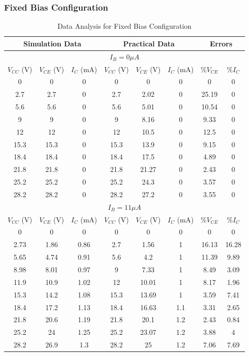\documentclass[12pt]{article}
\begin{document}
\subsubsection{Fixed Bias Configuration}
\bgroup
\def\arraystretch{1.5}
\begin{table}[h!]
    \centering
    \begin{tabular}{|c|c|c||c|c|c||c|c|}
        \hline
        \multicolumn{3}{|c||}{\textbf{Simulation Data}} & \multicolumn{3}{|c||}{\textbf{Practical Data}} & \multicolumn{2}{|c|}{\textbf{Errors}} \\ \hline\hline
        \multicolumn{8}{|c|}{\textbf{$I_B = 0\mu A$}} \\ \hline
        $V_{CC}$ (V) & $V_{CE}$ (V) & $I_C$ (mA) & $V_{CC}$ (V) & $V_{CE}$ (V) & $I_C$ (mA) & \%$V_{CE}$ & \%$I_C$ \\ \hline
        0 & 0 & 0 & 0 & 0 & 0 & 0 & 0 \\
        2.7 & 2.7 & 0 & 2.7 & 2.02 & 0 & 25.19 & 0  \\
        5.6 & 5.6 & 0 & 5.6 & 5.01 & 0 & 10.54 & 0 \\
        9 & 9 & 0 & 9 & 8.16 & 0 & 9.33 & 0 \\
        12 & 12 & 0 & 12 & 10.5 & 0 & 12.5 & 0 \\
        15.3 & 15.3 & 0 & 15.3 & 13.9 & 0 & 9.15 & 0 \\
        18.4 & 18.4 & 0 & 18.4 & 17.5 & 0 & 4.89 & 0 \\
        21.8 & 21.8 & 0 & 21.8 & 21.27 & 0 & 2.43 & 0 \\
        25.2 & 25.2 & 0 & 25.2 & 24.3 & 0 & 3.57 & 0 \\
        28.2 & 28.2 & 0 & 28.2 & 27.2 & 0 & 3.55 & 0 \\ \hline\hline
        \multicolumn{8}{|c|}{\textbf{$I_B = 11\mu A$}} \\ \hline
        $V_{CC}$ (V) & $V_{CE}$ (V) & $I_C$ (mA) & $V_{CC}$ (V) & $V_{CE}$ (V) & $I_C$ (mA) & \%$V_{CE}$ & \%$I_C$ \\ \hline
        0 & 0 & 0 & 0 & 0 & 0 & 0 & 0 \\
        2.73 & 1.86 & 0.86 & 2.7 & 1.56 & 1 & 16.13 & 16.28 \\
        5.65 & 4.74 & 0.91 & 5.6 & 4.2 & 1 & 11.39 & 9.89 \\
        8.98 & 8.01 & 0.97 & 9 & 7.33 & 1 & 8.49 & 3.09 \\
        11.9 & 10.9 & 1.02 & 12 & 10.01 & 1 & 8.17 & 1.96 \\
        15.3 & 14.2 & 1.08 & 15.3 & 13.69 & 1 & 3.59 & 7.41 \\
        18.4 & 17.2 & 1.13 & 18.4 & 16.63 & 1.1 & 3.31 & 2.65 \\
        21.8 & 20.6 & 1.19 & 21.8 & 20.1 & 1.2 & 2.43 & 0.84 \\
        25.2 & 24 & 1.25 & 25.2 & 23.07 & 1.2 & 3.88 & 4 \\
        28.2 & 26.9 & 1.3 & 28.2 & 25 & 1.2 & 7.06 & 7.69 \\ \hline
    \end{tabular}
    \caption{Data Analysis for Fixed Bias Configuration}
    \label{Fixed Bias}
\end{table}
\egroup
\end{document}
